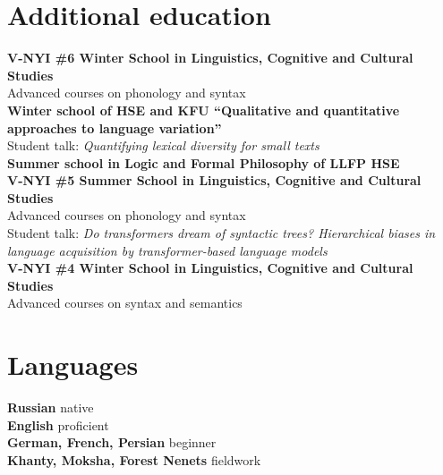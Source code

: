 \documentclass[11pt]{article} %
\begin{document}
\section*{Additional education}
 \textbf{V-NYI \#6 Winter School in Linguistics, Cognitive and Cultural Studies}\\
{Advanced courses on phonology and syntax}\\
 \textbf{Winter school of HSE and KFU ``Qualitative and quantitative approaches to language variation''}\\
{Student talk: \emph{Quantifying lexical diversity for small texts}}\\
 \textbf{Summer school in Logic and Formal Philosophy of LLFP HSE}\\
 \textbf{V-NYI \#5 Summer School in Linguistics, Cognitive and Cultural Studies}\\
{Advanced courses on phonology and syntax}\\
{Student talk: \emph{Do transformers dream of syntactic trees? Hierarchical biases in language acquisition by transformer-based language models}}\\
 \textbf{V-NYI \#4 Winter School in Linguistics, Cognitive and Cultural Studies}\\
{Advanced courses on syntax and semantics}\\

\section*{Languages}

\textbf{Russian} native\\
\textbf{English} proficient\\
\textbf{German, French, Persian} beginner\\
\textbf{Khanty, Moksha, Forest Nenets} fieldwork




\end{document}

